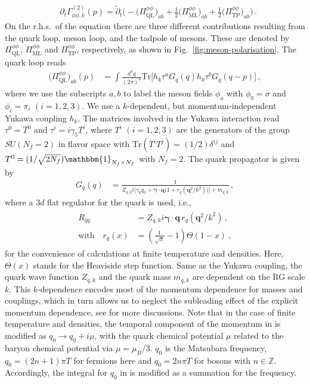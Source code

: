 \documentclass[reprint,english,superscriptaddress,preprintnumbers,amsmath,amssymb,aps,prd,nofootinbib]{revtex4-2}
\newcommand{\bs}[1]{\boldsymbol{#1}}
\def\Fig#1{Fig.~\ref{#1}}
\begin{document}
%
\begin{align}
  &\partial_t\Gamma^{(2)}_{\phi\phi,k}(p)=\tilde{\partial}_t\bigg(-\big(\Pi^{\phi\phi}_{\mathrm{QL}}\big)_{ab}+\frac{1}{2}\big(\Pi^{\phi\phi}_{\mathrm{ML}}\big)_{ab}+\frac{1}{2}\big(\Pi^{\phi\phi}_{\mathrm{TP}}\big)_{ab}\bigg)\,.
  \label{eq:gammapi_Pi}
\end{align}
%
On the r.h.s.\ of the equation there are three different contributions resulting from the quark loop, meson loop, and the tadpole of mesons. These are denoted by $\Pi^{\phi\phi}_{\mathrm{QL}}$, $\Pi^{\phi\phi}_{\mathrm{ML}}$ and $\Pi^{\phi\phi}_{\mathrm{TP}}$, respectively, as shown in \Fig{fig:meson-polarisation}. 
The quark loop reads 
%
\begin{align}
  \big(\Pi^{\phi\phi}_{\mathrm{QL}}\big)_{ab}(p)&=\int \frac{d^4 q}{(2\pi)^4}\mathrm{Tr}\Big[h_k \tau^{a}G_{q}(q)h_k \tau^{b}G_{q}(q-p)\Big]\,,\label{eq:Piphi-QL}
\end{align}
%
where we use the subscripts $a, b$ to label the meson fields $\phi_{a}$ with $\phi_0=\sigma$ and  $\phi_i=\pi_i$ $(i=1,2,3)$. We use a $k$-dependent, but momentum-independent Yukawa coupling $h_k$. 
The matrices involved in the Yukawa interaction read $\tau^{0}=T^0$ and $\tau^{i}=i \gamma_5 T^i$, where $T^i$ $(i=1,2,3)$ are the generators of the group $SU(N_f=2)$ in flavor space with $\mathrm{Tr} (T^i T^j)=(1/2)\delta^{ij}$ and $T^{0}=(1/\sqrt{2N_{f}})\mathbbm{1}_{N_{f}\times N_{f}}$ with $N_f=2$. 
The quark propagator is given by
%
\begin{align}
  G_{q}(q)&=\frac{1}{Z_{q,k} i \Big[\gamma_0 q_0+\bs{\gamma}\cdot\bs{q}\big(1+r_q(\bs{q}^2/k^2)\big)\Big]+m_{q,k}} \,,\label{eq:Gq}
\end{align}
%
where a $3d$ flat regulator for the quark is used, i.e.,
%
\begin{align}
\begin{split}
  R_{\bar q q}&=Z_{q,k} i \bs{\gamma}\cdot\bs{q}\,r_q(\bs{q}^2/k^2)\,,\\[2ex] \mathrm{with} \quad r_q(x)&=\left(\frac{1}{\sqrt{x}}-1\right)\Theta(1-x)\,,\label{eq:Rq}
  \end{split}
\end{align}
%
for the convenience of calculations at finite temperature and densities. 
Here, $\Theta(x)$ stands for the Heaviside step function. 
Same as the Yukawa coupling, the quark wave function  $Z_{q,k}$ and the quark mass $m_{q,k}$ are dependent on the RG scale $k$. 
This $k$-dependence encodes most of the momentum dependence for masses and couplings, which in turn allows us to  neglect the subleading effect of the explicit momentum dependence, see \cite{Fu:2019hdw} for more discussions. 
Note that in the case of finite temperature and densities, the temporal component of the momentum in  is modified as $q_0\to q_0 +i \mu $, with the quark chemical potential $\mu$ related to the baryon chemical potential via $\mu=\mu_B/3$. $q_0$ is the Matsubara frequency, $q_0=(2n+1)\pi T $ for fermions here and $q_0=2n\pi  T$ for bosons with $n\in \mathbb{Z}$. 
Accordingly, the integral for $q_0$ in  is modified as a summation for the frequency.
\end{document}
